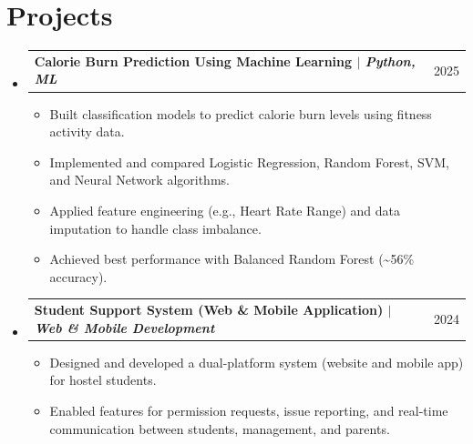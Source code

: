 \documentclass[a4paper,11pt]{article}
\makeatletter
\newcommand{\resumeItem}[1]{
  \item\small{#1}
}
\newcommand{\resumeProjectHeading}[2]{
  \item
    \begin{tabular*}{0.97\textwidth}{l@{\extracolsep{\fill}}r}
      \small\textbf{#1} & \small #2 \\
    \end{tabular*}\vspace{-5pt}
}
\newcommand{\resumeSubHeadingListStart}{\begin{itemize}[leftmargin=0.15in, label={}]}
\newcommand{\resumeSubHeadingListEnd}{\end{itemize}}
\newcommand{\resumeItemListStart}{\begin{itemize}[leftmargin=0.25in, itemsep=2pt, parsep=0pt, topsep=0pt]}
\newcommand{\resumeItemListEnd}{\end{itemize}\vspace{-5pt}}
\makeatother
\begin{document}
\section{Projects}
\resumeSubHeadingListStart
  \resumeProjectHeading
    {Calorie Burn Prediction Using Machine Learning $|$ \emph{Python, ML}}{2025}
    \resumeItemListStart
      \resumeItem{Built classification models to predict calorie burn levels using fitness activity data.}
      \resumeItem{Implemented and compared Logistic Regression, Random Forest, SVM, and Neural Network algorithms.}
      \resumeItem{Applied feature engineering (e.g., Heart Rate Range) and data imputation to handle class imbalance.}
      \resumeItem{Achieved best performance with Balanced Random Forest (\textasciitilde56\% accuracy).}
    \resumeItemListEnd
  \resumeProjectHeading
    {Student Support System (Web \& Mobile Application) $|$ \emph{Web \& Mobile Development}}{2024}
    \resumeItemListStart
      \resumeItem{Designed and developed a dual-platform system (website and mobile app) for hostel students.}
      \resumeItem{Enabled features for permission requests, issue reporting, and real-time communication between students, management, and parents.}
    \resumeItemListEnd
\resumeSubHeadingListEnd

\end{document}
